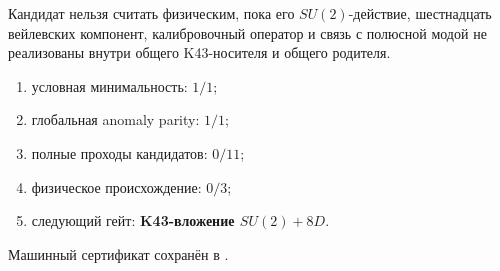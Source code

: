 \begin{nogocriterion}
Кандидат нельзя считать физическим, пока его $SU(2)$-действие, шестнадцать
вейлевских компонент, калибровочный оператор и связь с полюсной модой не
реализованы внутри общего K43-носителя и общего родителя.
\end{nogocriterion}

\begin{protocol}\begin{enumerate}
\item условная минимальность: \textbf{$1/1$};
\item глобальная anomaly parity: \textbf{$1/1$};
\item полные проходы кандидатов: \textbf{$0/11$};
\item физическое происхождение: \textbf{$0/3$};
\item следующий гейт: \textbf{K43-вложение $SU(2)+8D$}.
\end{enumerate}\end{protocol}

Машинный сертификат сохранён в
.